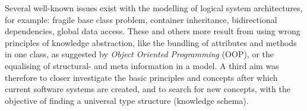Several well-known issues exist with the modelling of logical system
architectures, for example: fragile base class problem, container inheritance,
bidirectional dependencies, global data access. These and others more result
from using wrong principles of knowledge abstraction, like the bundling of
attributes and methods in one class, as suggested by
\emph{Object Oriented Programming} (OOP), or the equalising of
structural- and meta information in a model. A third aim was therefore to
closer investigate the basic principles and concepts after which current
software systems are created, and to search for new concepts, with the
objective of finding a universal type structure (knowledge schema).
